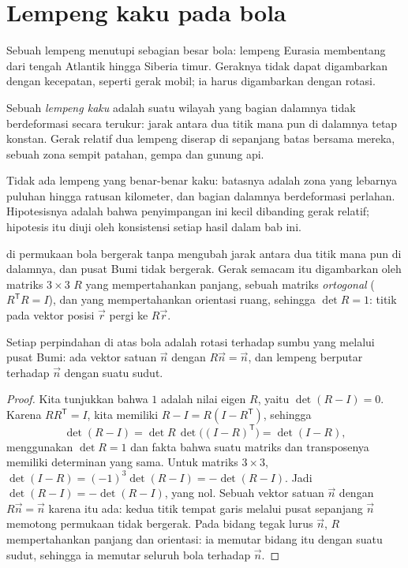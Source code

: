 \section{Lempeng kaku pada bola}

Sebuah lempeng menutupi sebagian besar bola: lempeng Eurasia membentang dari tengah Atlantik hingga Siberia timur. Geraknya tidak dapat digambarkan dengan kecepatan, seperti gerak mobil; ia harus digambarkan dengan rotasi.

\begin{definition}\label{def:b1:plate-kinematics:rigid-plate}
Sebuah \emph{lempeng kaku} adalah suatu wilayah  yang bagian dalamnya tidak berdeformasi secara terukur: jarak antara dua titik mana pun di dalamnya tetap konstan. Gerak relatif dua lempeng diserap di sepanjang batas bersama mereka, sebuah zona sempit patahan, gempa dan gunung api.
\end{definition}

Tidak ada lempeng yang benar-benar kaku: batasnya adalah zona yang lebarnya puluhan hingga ratusan kilometer, dan bagian dalamnya berdeformasi perlahan. Hipotesisnya adalah bahwa penyimpangan ini kecil dibanding gerak relatif; hipotesis itu diuji oleh konsistensi setiap hasil dalam bab ini.

 di permukaan bola bergerak tanpa mengubah jarak antara dua titik mana pun di dalamnya, dan pusat Bumi tidak bergerak. Gerak semacam itu digambarkan oleh matriks $3\times3$ $R$ yang mempertahankan panjang, sebuah matriks \emph{ortogonal} ($R^{\mathsf T}R = I$), dan yang mempertahankan orientasi ruang, sehingga $\det R = 1$: titik pada vektor posisi $\vec r$ pergi ke $R\vec r$.

\begin{theorem}\label{thm:b1:plate-kinematics:euler}
Setiap perpindahan  di atas bola adalah rotasi terhadap sumbu yang melalui pusat Bumi: ada vektor satuan $\vec n$ dengan $R\vec n = \vec n$, dan lempeng berputar terhadap $\vec n$ dengan suatu sudut.
\end{theorem}

\begin{proof}
Kita tunjukkan bahwa $1$ adalah nilai eigen $R$, yaitu $\det(R - I) = 0$. Karena $R R^{\mathsf T} = I$, kita memiliki $R - I = R(I - R^{\mathsf T})$, sehingga
\[
  \det(R - I) = \det R\,\det\bigl((I - R)^{\mathsf T}\bigr) = \det(I - R),
\]
menggunakan $\det R = 1$ dan fakta bahwa suatu matriks dan transposenya memiliki determinan yang sama. Untuk matriks $3\times3$,
$\det(I - R) = (-1)^3\det(R - I) = -\det(R - I)$. Jadi $\det(R - I) =
-\det(R - I)$, yang nol. Sebuah vektor satuan $\vec n$ dengan $R\vec n = \vec n$ karena itu ada: kedua titik tempat garis melalui pusat sepanjang $\vec n$ memotong permukaan tidak bergerak. Pada bidang tegak lurus $\vec n$, $R$ mempertahankan panjang dan orientasi: ia memutar bidang itu dengan suatu sudut, sehingga ia memutar seluruh bola terhadap $\vec n$.
\end{proof}

